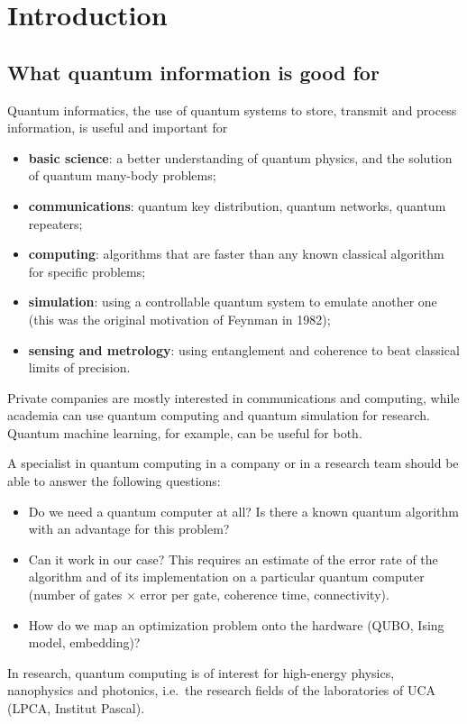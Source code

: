 \chapter{Introduction}\label{ch:intro}

\section{What quantum information is good for}
Quantum informatics, the use of quantum systems to store, transmit and process information, is
useful and important for
\begin{itemize}
  \item \textbf{basic science}: a better understanding of quantum physics, and the solution of quantum many-body problems;
  \item \textbf{communications}: quantum key distribution, quantum networks, quantum repeaters;
  \item \textbf{computing}: algorithms that are faster than any known classical algorithm for specific problems;
  \item \textbf{simulation}: using a controllable quantum system to emulate another one (this was the original motivation of Feynman in 1982);
  \item \textbf{sensing and metrology}: using entanglement and coherence to beat classical limits of precision.
\end{itemize}
Private companies are mostly interested in communications and computing, while academia can use
quantum computing and quantum simulation for research. Quantum machine learning, for example, can be useful for both.

A specialist in quantum computing in a company or in a research team should be able to answer the following questions:
\begin{itemize}
  \item Do we need a quantum computer at all? Is there a known quantum algorithm with an advantage for this problem?
  \item Can it work in our case? This requires an estimate of the error rate of the algorithm and of its implementation on a particular quantum computer
  (number of gates $\times$ error per gate, coherence time, connectivity).
  \item How do we map an optimization problem onto the hardware (QUBO, Ising model, embedding)?
\end{itemize}
In research, quantum computing is of interest for high-energy physics, nanophysics and photonics, i.e.\
the research fields of the laboratories of UCA (LPCA, Institut Pascal).

